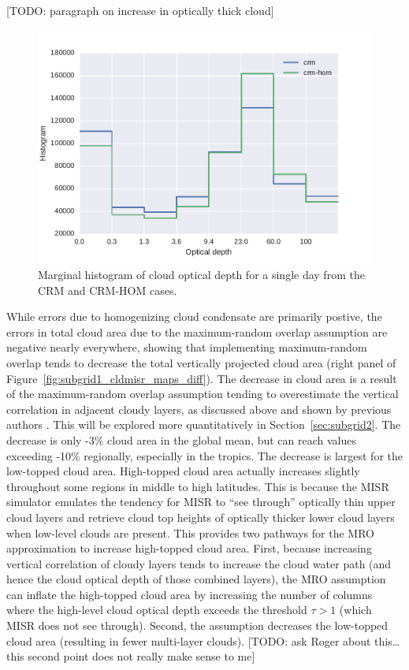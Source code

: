 {[}TODO: paragraph on increase in optically thick cloud{]}

\begin{figure}[htbp]
\centering
\includegraphics{graphics/subgrid1_taudist.pdf}
\caption{\label{fig:subgrid1_taudist}Marginal histogram of cloud optical
depth for a single day from the CRM and CRM-HOM
cases.}\label{fig:subgrid1ux5ftaudist}
\end{figure}

While errors due to homogenizing cloud condensate are primarily postive,
the errors in total cloud area due to the maximum-random overlap
assumption are negative nearly everywhere, showing that implementing
maximum-random overlap tends to decrease the total vertically projected
cloud area (right panel of Figure~\ref{fig:subgrid1_cldmisr_maps_diff}).
The decrease in cloud area is a result of the maximum-random overlap
assumption tending to overestimate the vertical correlation in adjacent
cloudy layers, as discussed above and shown by previous authors
\citep{mace_and_benson-troth_2002, hogan_and_illingworth_2000, barker_2008}.
This will be explored more quantitatively in Section~\ref{sec:subgrid2}.
The decrease is only -3\% cloud area in the global mean, but can reach
values exceeding -10\% regionally, especially in the tropics. The
decrease is largest for the low-topped cloud area. High-topped cloud
area actually increases slightly throughout some regions in middle to
high latitudes. This is because the MISR simulator emulates the tendency
for MISR to ``see through'' optically thin upper cloud layers and
retrieve cloud top heights of optically thicker lower cloud layers when
low-level clouds are present. This provides two pathways for the MRO
approximation to increase high-topped cloud area. First, because
increasing vertical correlation of cloudy layers tends to increase the
cloud water path (and hence the cloud optical depth of those combined
layers), the MRO assumption can inflate the high-topped cloud area by
increasing the number of columns where the high-level cloud optical
depth exceeds the threshold \(\tau > 1\) (which MISR does not see
through). Second, the assumption decreases the low-topped cloud area
(resulting in fewer multi-layer clouds). {[}TODO: ask Roger about
this\ldots{}this second point does not really make sense to me{]}

